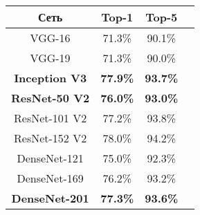 \begin{table}[H]
  \centering
  \begin{tabular}{|c|c|c|c|}
    \hline    
    Сеть          & Top-1   & Top-5     \\
    \hline
    VGG-16        & 71.3\%	& 90.1\%    \\
    \hline
    VGG-19        & 71.3\%	& 90.0\%    \\
    \hline
    \textbf{Inception V3}  & \textbf{77.9\%}	& \textbf{93.7\%}    \\
    \hline
    \textbf{ResNet-50 V2}  & \textbf{76.0\%}	& \textbf{93.0\%}    \\
    \hline
    ResNet-101 V2 & 77.2\%	& 93.8\%    \\
    \hline
    ResNet-152 V2 & 78.0\%	& 94.2\%    \\
    \hline
    DenseNet-121  & 75.0\%	& 92.3\%    \\
    \hline
    DenseNet-169  & 76.2\%	& 93.2\%    \\
    \hline
    \textbf{DenseNet-201}  & \textbf{77.3\%}	& \textbf{93.6\%}    \\
    \hline
  \end{tabular}
\end{table}